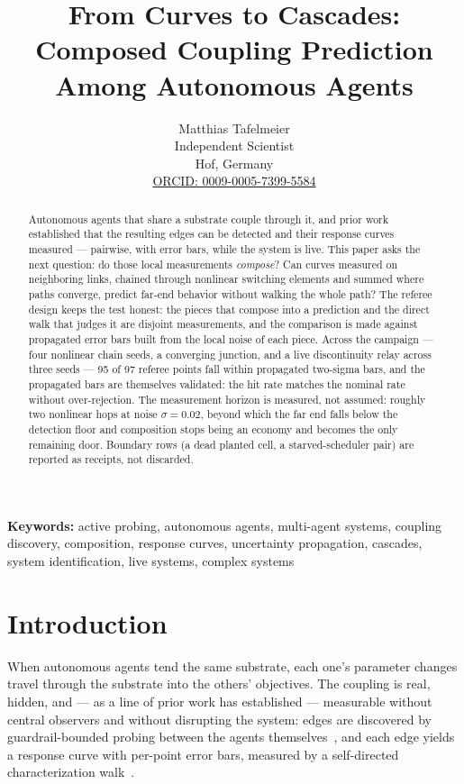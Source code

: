 \documentclass[11pt,a4paper]{article}
\title{From Curves to Cascades: Composed Coupling Prediction Among
       Autonomous Agents}
\author{
  Matthias Tafelmeier \\
  Independent Scientist \\
  Hof, Germany \\
  \href{https://orcid.org/0009-0005-7399-5584}{ORCID: 0009-0005-7399-5584}
}
\date{}
\begin{document}
\maketitle

\begin{abstract}
Autonomous agents that share a substrate couple through it, and prior
work established that the resulting edges can be detected and their
response curves measured --- pairwise, with error bars, while the system
is live. This paper asks the next question: do those local measurements
\emph{compose}? Can curves measured on neighboring links, chained
through nonlinear switching elements and summed where paths converge,
predict far-end behavior without walking the whole path? The referee
design keeps the test honest: the pieces that compose into a prediction
and the direct walk that judges it are disjoint measurements, and the
comparison is made against propagated error bars built from the local
noise of each piece. Across the campaign --- four nonlinear chain
seeds, a converging junction, and a live discontinuity relay across
three seeds --- 95 of 97 referee points fall within propagated
two-sigma bars, and the propagated bars are themselves validated: the
hit rate matches the nominal rate without over-rejection. The
measurement horizon is measured, not assumed: roughly two nonlinear
hops at noise $\sigma{=}0.02$, beyond which the far end falls below
the detection floor and composition stops being an economy and becomes
the only remaining door. Boundary rows (a dead planted cell, a
starved-scheduler pair) are reported as receipts, not discarded.
\end{abstract}

\noindent\textbf{Keywords:} active probing, autonomous agents,
multi-agent systems, coupling discovery, composition, response curves,
uncertainty propagation, cascades, system identification, live
systems, complex systems

\section{Introduction}
\label{sec:intro}

When autonomous agents tend the same substrate, each one's parameter
changes travel through the substrate into the others' objectives. The
coupling is real, hidden, and --- as a line of prior work has
established --- measurable without central observers and without
disrupting the system: edges are discovered by guardrail-bounded
probing between the agents themselves~\cite{p1}, and each edge yields a
response curve with per-point error bars, measured by a self-directed
characterization walk~\cite{p2}.
\end{document}
